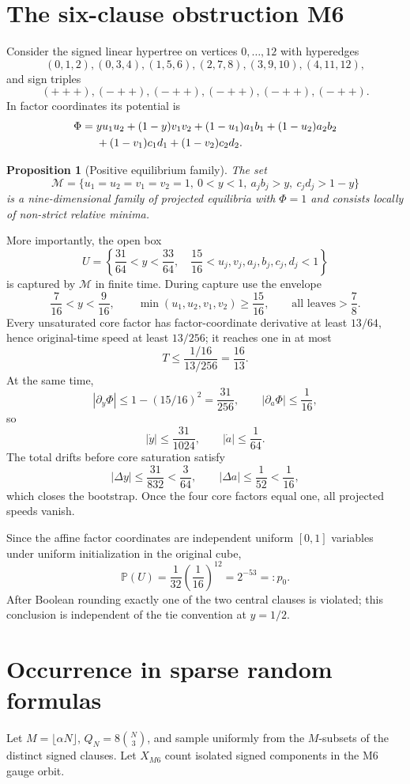 \documentclass[11pt,a4paper]{article}
\newtheorem{proposition}[theorem]{Proposition}
\begin{document}
\section{The six-clause obstruction M6}\label{sec:m6}
Consider the signed linear hypertree on vertices $0,\ldots,12$ with hyperedges
\[
(0,1,2),(0,3,4),(1,5,6),(2,7,8),(3,9,10),(4,11,12),
\]
and sign triples
\[
(+++) ,(-++),(-++),(-++),(-++),(-++).
\]
In factor coordinates its potential is
\begin{align}
\Phi={}&yu_1u_2+(1-y)v_1v_2+(1-u_1)a_1b_1+(1-u_2)a_2b_2\notag\\
&+(1-v_1)c_1d_1+(1-v_2)c_2d_2.
\end{align}
\begin{proposition}[Positive equilibrium family]
The set
\[
\mathcal M=\{u_1=u_2=v_1=v_2=1,\ 0<y<1,\ a_jb_j>y,\ c_jd_j>1-y\}
\]
is a nine-dimensional family of projected equilibria with $\Phi=1$ and consists locally of non-strict relative minima.
\end{proposition}
More importantly, the open box
\begin{equation}
U=\left\{\frac{31}{64}<y<\frac{33}{64},\quad \frac{15}{16}<u_j,v_j,a_j,b_j,c_j,d_j<1\right\}
\end{equation}
is captured by $\mathcal M$ in finite time. During capture use the envelope
\[
\frac7{16}<y<\frac9{16},\qquad \min(u_1,u_2,v_1,v_2)\ge\frac{15}{16},\qquad \text{all leaves}>\frac78.
\]
Every unsaturated core factor has factor-coordinate derivative at least $13/64$, hence original-time speed at least $13/256$; it reaches one in at most
\[
T\le\frac{1/16}{13/256}=\frac{16}{13}.
\]
At the same time,
\[
|\partial_y\Phi|\le1-(15/16)^2=\frac{31}{256},\qquad |\partial_a\Phi|\le\frac1{16},
\]
so
\[
|\dot y|\le\frac{31}{1024},\qquad |\dot a|\le\frac1{64}.
\]
The total drifts before core saturation satisfy
\[
|\Delta y|\le\frac{31}{832}<\frac3{64},\qquad |\Delta a|\le\frac1{52}<\frac1{16},
\]
which closes the bootstrap. Once the four core factors equal one, all projected speeds vanish.

Since the affine factor coordinates are independent uniform $[0,1]$ variables under uniform initialization in the original cube,
\begin{equation}\mathbb P(U)=\frac1{32}\left(\frac1{16}\right)^{12}=2^{-53}=:p_0.\end{equation}
After Boolean rounding exactly one of the two central clauses is violated; this conclusion is independent of the tie convention at $y=1/2$.
\section{Occurrence in sparse random formulas}
Let $M=\lfloor\alpha N\rfloor$, $Q_N=8\binom N3$, and sample uniformly from the $M$-subsets of the distinct signed clauses. Let $X_{M6}$ count isolated signed components in the M6 gauge orbit.
\end{document}
